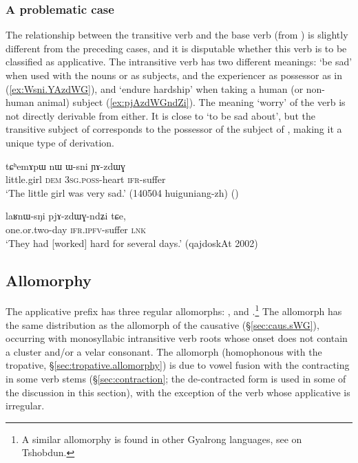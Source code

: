 \subsubsection{A problematic case} \label{sec:nWzdWG}
The relationship between the transitive verb   and the base verb  (from ) is slightly different from the preceding cases, and it is disputable whether this verb is to be classified as applicative. The intransitive verb  has two different meanings: `be sad' when used with the nouns  or  as subjects, and the experiencer as possessor as in (\ref{ex:Wsni.YAzdWG}), and `endure hardship' when taking a human (or non-human animal) subject (\ref{ex:pjAzdWGndZi}). The meaning `worry' of the verb  is not directly derivable from either. It is close to `to be sad about', but the transitive subject of  corresponds to the possessor of the subject of , making it a unique type of derivation.

\begin{exe}
\ex \label{ex:Wsni.YAzdWG}
\gll  tɕʰemɤpɯ nɯ ɯ-sni ɲɤ-zdɯɣ \\
little.girl \textsc{dem} \textsc{3sg}.\textsc{poss}-heart \textsc{ifr}-suffer \\
\glt `The little girl was very sad.' (140504 huiguniang-zh)
()
\end{exe}

\begin{exe}
\ex \label{ex:pjAzdWGndZi}
\gll  laʁnɯ-sŋi pjɤ-zdɯɣ-ndʑi tɕe, \\
one.or.two-day \textsc{ifr}.\textsc{ipfv}-suffer \textsc{lnk} \\
\glt `They had [worked] hard for several days.' (qajdoskAt 2002)
\end{exe}


\subsection{Allomorphy} \label{sec:allomorphy.applicative}
The applicative prefix has three regular allomorphs: ,  and .\footnote{A similar allomorphy is found in other Gyalrong languages, see \citet{jackson06paisheng} on Tshobdun.} The allomorph  has the same distribution as the  allomorph of the causative (§\ref{sec:caus.sWG}), occurring with monosyllabic intransitive verb roots whose onset does not contain a cluster and/or a velar consonant. The allomorph  (homophonous with the tropative, §\ref{sec:tropative.allomorphy}) is due to vowel fusion with the contracting  in some verb stems (§\ref{sec:contraction}; the de-contracted form  is used in some of the discussion in this section), with the exception of the verb  whose applicative is irregular. 

